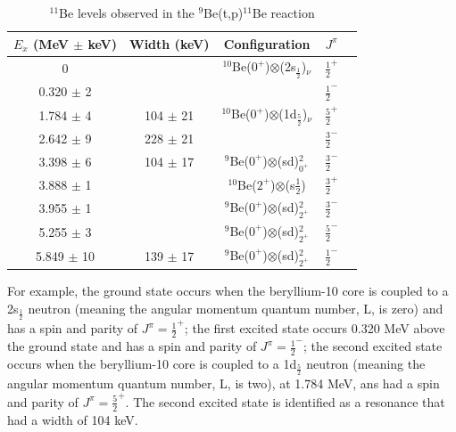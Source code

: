 \documentclass[11pt]{article} %
\begin{document}
\begin{table}[ht] 
\caption{$^{11}$Be levels observed in the $^{9}$Be(t,p)$^{11}$Be reaction}%
\centering %
\begin{tabular}{c c c c c} %
\hline\hline %
$E_{x}$ (MeV $\pm$ keV) & Width (keV) & Configuration & $J^{\pi}$ \\ [0.5ex] %
\hline %
0                           &                           & $^{10}$Be($0^{+}$)$\otimes$(2s$_{\frac{1}{2}}$)$_{\nu}$ & $\frac{1}{2}^{+}$ \\ [1ex] %
0.320 $\pm$ 2   &                           &                                                                                                         & $\frac{1}{2}^{-}$ \\ [1ex]
1.784 $\pm$ 4   & 104 $\pm$ 21 & $^{10}$Be($0^{+}$)$\otimes$(1d$_{\frac{5}{2}}$)$_{\nu}$ & $\frac{5}{2}^{+}$ \\ [1ex]
2.642 $\pm$ 9   & 228 $\pm$ 21 &                                                                                                         & $\frac{3}{2}^{-}$ \\ [1ex]
3.398 $\pm$ 6   & 104 $\pm$ 17 & $^{9}$Be($0^{+}$)$\otimes$(sd)$^{2}_{0^{+}}$                    & $\frac{3}{2}^{-}$ \\ [1ex]
3.888 $\pm$ 1   &                           & $^{10}$Be($2^{+}$)$\otimes$(s$\frac{1}{2}$)                        & $\frac{3}{2}^{+}$ \\ [1ex] 
3.955 $\pm$ 1   &                           & $^{9}$Be($0^{+}$)$\otimes$(sd)$^{2}_{2^{+}}$                    & $\frac{3}{2}^{-}$ \\ [1ex]  
5.255 $\pm$ 3   &                           & $^{9}$Be($0^{+}$)$\otimes$(sd)$^{2}_{2^{+}}$                    & $\frac{5}{2}^{-}$ \\ [1ex]
5.849 $\pm$ 10 & 139 $\pm$ 17 & $^{9}$Be($0^{+}$)$\otimes$(sd)$^{2}_{2^{+}}$                    & $\frac{1}{2}^{-}$ \\ [1ex] %
\hline %
\end{tabular} 
\label{table:nonlin} %
\end{table} 

For example, the ground state occurs when the beryllium-10 core is coupled to a 2s$_\frac{1}{2}$ neutron (meaning the angular momentum quantum number, L, is zero) and has a spin and parity of $J^{\pi}=\frac{1}{2}^{+}$; the first excited state occurs 0.320 MeV above the ground state and has a spin and parity of $J^{\pi}=\frac{1}{2}^{-}$; the second excited state occurs when the beryllium-10 core is coupled to a 1d$_{\frac{5}{2}}$ neutron (meaning the angular momentum quantum number, L, is two), at 1.784 MeV, ans had a spin and parity of $J^{\pi}=\frac{5}{2}^{+}$. The second excited state is identified as a resonance that had a width of 104 keV.
\end{document}
